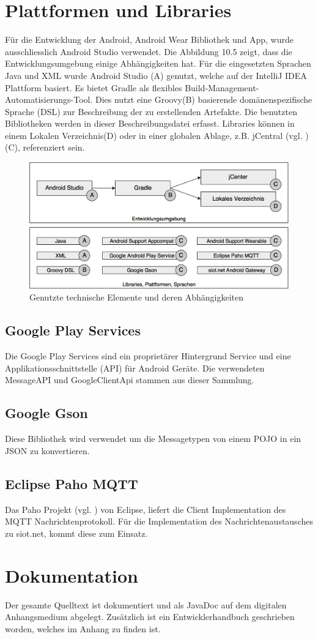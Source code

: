 \section{Plattformen und Libraries}
Für die Entwicklung der Android, Android Wear Bibliothek und App, wurde ausschliesslich Android Studio verwendet. Die Abbildung 10.5 zeigt, dass die Entwicklungsumgebung einige Abhängigkeiten hat. Für die eingesetzten Sprachen Java und XML wurde Android Studio (A) genutzt, welche auf der IntelliJ IDEA Plattform basiert. Es bietet Gradle als flexibles Build-Management-Automatisierungs-Tool. Dies nutzt eine Groovy(B) basierende domänenspezifische Sprache (DSL) zur Beschreibung der zu erstellenden Artefakte. Die benutzten Bibliotheken werden in dieser Beschreibungsdatei erfasst. Libraries können in einem Lokalen Verzeichnis(D) oder in einer globalen Ablage, z.B. jCentral (vgl. \cite{grdl:jcenter})(C), referenziert sein.
\begin{figure}[H]
  \centering
  \includegraphics[scale=0.28]{98_Bilder/10_Implementation/PlattformLibraries}
  \caption[Plattforme, Libraries]{Genutzte technische Elemente und deren Abhängigkeiten}
\end{figure}
\subsection{Google Play Services}
Die Google Play Services sind ein proprietärer Hintergrund Service und eine Applikationsschnittstelle (\gls{API}) für Android Geräte. Die verwendeten Message\gls{API} und GoogleClientApi stammen aus dieser Sammlung.
\subsection{Google Gson}
Diese Bibliothek wird verwendet um die Messagetypen von einem POJO in ein \gls{JSON} zu konvertieren.
\subsection{Eclipse Paho MQTT}
Das Paho Projekt (vgl. \cite{eclp:paho}) von Eclipse, liefert die Client Implementation des \gls{MQTT} Nachrichtenprotokoll. Für die Implementation des Nachrichtenaustausches zu siot.net, kommt diese zum Einsatz.

\section{Dokumentation}
Der gesamte Quelltext ist dokumentiert und als JavaDoc auf dem digitalen Anhangsmedium abgelegt. Zusätzlich ist ein Entwicklerhandbuch geschrieben worden, welches im Anhang zu finden ist.
